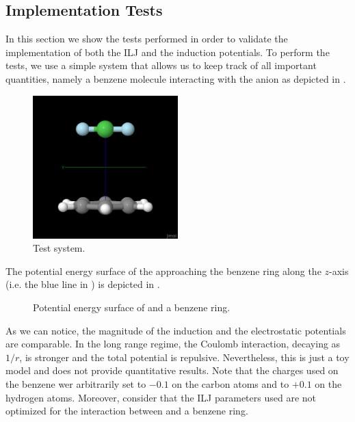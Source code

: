 \documentclass[utf8]{article}
\begin{document}
\subsection{Implementation Tests}
In this section we show the tests performed in order to validate the implementation of both
the ILJ and the induction potentials.
To perform the tests, we use a simple system that allows us to keep track of all important
quantities, namely a benzene molecule interacting with the \ntm anion as depicted in
.
%
\begin{figure}
    \captionsetup{width=\textwidth}
    \centering
    \includegraphics[width=0.5\textwidth]{n3_benzene}
    \caption{Test system.}
    \label{fig:n3_benzene}
\end{figure}
%
The potential energy surface of the \ntm approaching the benzene ring along the $z$-axis
(i.e. the blue line in ) is depicted in .
%
\begin{figure}
    \captionsetup{width=\textwidth}
    \centering
    
    \caption{Potential energy surface of \ntm and a benzene ring.}
    \label{fig:n3_benzene_pes}
\end{figure}
%
As we can notice, the magnitude of the induction and the electrostatic potentials are
comparable. In the long range regime, the Coulomb interaction, decaying as $1/r$, is stronger
and the total potential is repulsive.
Nevertheless, this is just a toy model and does not provide quantitative results.
Note that the charges used on the benzene wer arbitrarily set to $-0.1$ on the carbon atoms
and to $+0.1$ on the hydrogen atoms.
Moreover, consider that the ILJ parameters used are not optimized for the interaction 
between \ntm and a benzene ring.\\
\end{document}
